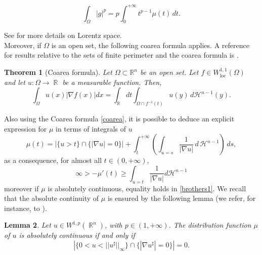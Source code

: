 \documentclass[12pt]{article}
\newcommand{\abs}[1]{{\left|#1\right|}}
\theoremstyle{definition}
\theoremstyle{plain}
\newtheorem{teorema}{Theorem}[section]
\newtheorem{lemma}[teorema]{Lemma}
\theoremstyle{definition}
\DeclareMathOperator{\R}{\mathbb{R}}
\begin{document}
$$\int_\Omega \abs{g}^p =p \int_0^{+\infty} t^{p-1} \mu(t) \, dt.$$
	
\noindent See \cite{T94} for more details on Lorentz space.\\
Moreover, if $\Omega$ is an open set, the following coarea formula applies. A reference for results relative to the sets of finite perimeter and the coarea formula is \cite{AFP}.
\begin{teorema}[Coarea formula]
	Let $\Omega \subset \mathbb{R}^n$ be an open set. Let $f\in W^{1,1}_{\text{loc}}(\Omega)$ and let $u:\Omega\to\R$ be a measurable function. Then,
	\begin{equation}
        	\label{coarea}
		{\displaystyle \int _{\Omega}u(x)|\nabla f(x)|dx=\int _{\mathbb {R} }dt\int_{\Omega\cap f^{-1}(t)}u(y)\, d\mathcal {H}^{n-1}(y)}.
	\end{equation}
\end{teorema}
Also using the Coarea formula \eqref{coarea}, it is possible to deduce an explicit expression for $\mu$ in terms of integrals of $u$
\begin{equation*}
    \mu(t)=\abs{\{u>t\}\cap \{|\nabla u |=0\}}+ \int_t^{+\infty} \left(\int_{u=s}\frac{1}{\abs{\nabla u}}\, d\, \mathcal{H}^{n-1}\right)\, ds,
\end{equation*}
as a consequence, for almost all $t\in (0,+\infty)$,
    \begin{equation}\label{brothers1}
        \infty>-\mu'(t)\geq\displaystyle \int_{u=t}\dfrac{1}{|\nabla u|}d\mathcal{H}^{n-1}
    \end{equation}
moreover if $\mu$ is absolutely continuous, equality holds in \eqref{brothers1}. We recall that the absolute continuity of $\mu$ is ensured by the following lemma (we refer, for instance, to \cite{BZ}).
\begin{lemma}\label{Broz}
Let $u\in W^{1,p}(\R^n)$, with $p\in(1,+\infty)$. The distribution function $\mu$ of $u$ is absolutely continuous if and only if 
\begin{equation*}
    \abs{\{0<u<  ||u^\sharp||_\infty\}\cap \{|\nabla u^\sharp| =0\}}=0.
\end{equation*}
\end{lemma}
\end{document}
